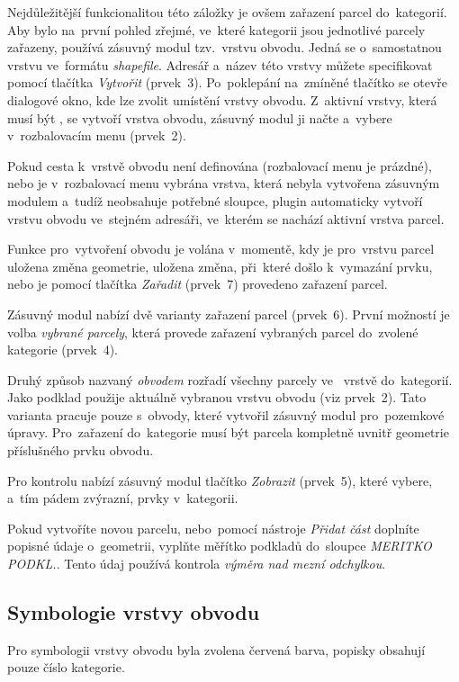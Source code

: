 Nejdůležitější funkcionalitou této záložky je ovšem zařazení parcel do~kategorií. Aby bylo na~první pohled zřejmé, ve~které kategorii jsou jednotlivé parcely zařazeny, používá zásuvný modul tzv.~vrstvu obvodu. Jedná se o~samostatnou vrstvu ve~formátu \textit{shapefile}. Adresář a~název této vrstvy můžete specifikovat pomocí tlačítka \textit{Vytvořit} (prvek~3). Po~poklepání na~zmíněné tlačítko se otevře dialogové okno, kde lze zvolit umístění vrstvy obvodu. Z~aktivní vrstvy, která musí být , se vytvoří vrstva obvodu, zásuvný modul ji načte a~vybere v~rozbalovacím menu (prvek~2).

Pokud cesta k~vrstvě obvodu není definována (rozbalovací menu je prázdné), nebo je v~rozbalovací menu vybrána vrstva, která nebyla vytvořena zásuvným modulem a~tudíž neobsahuje potřebné sloupce, plugin automaticky vytvoří vrstvu obvodu ve~stejném adresáři, ve~kterém se nachází aktivní vrstva parcel.

Funkce pro~vytvoření obvodu je volána v~momentě, kdy je pro~vrstvu parcel uložena změna geometrie, uložena změna, při~které došlo k~vymazání prvku, nebo je pomocí tlačítka \textit{Zařadit} (prvek~7) provedeno zařazení parcel.

Zásuvný modul nabízí dvě varianty zařazení parcel (prvek~6). První možností je volba \textit{vybrané parcely}, která provede zařazení vybraných parcel do~zvolené kategorie (prvek~4).

Druhý způsob nazvaný \textit{obvodem} rozřadí všechny parcely ve~ vrstvě do~ka\-tegorií. Jako podklad použije aktuálně vybranou vrstvu obvodu (viz prvek~2). Tato varianta pracuje pouze s~obvody, které vytvořil zásuvný modul pro~pozemkové úpravy. Pro~zařazení do~kategorie musí být parcela kompletně uvnitř geometrie příslušného prvku obvodu.

Pro kontrolu nabízí zásuvný modul tlačítko \textit{Zobrazit} (prvek~5), které vybere, a~tím pádem zvýrazní, prvky v~kategorii.

Pokud vytvoříte novou parcelu, nebo~pomocí nástroje \textit{Přidat část} doplníte popis\-né údaje o~geometrii, vyplňte měřítko podkladů do~sloupce \textit{MERITKO PODKL.}. Tento údaj používá kontrola \textit{výměra nad mezní odchylkou}.

\subsection{Symbologie vrstvy obvodu}
\label{manual_editace_symbologie}

Pro symbologii vrstvy obvodu byla zvolena červená barva, popisky obsahují pouze číslo kategorie.

